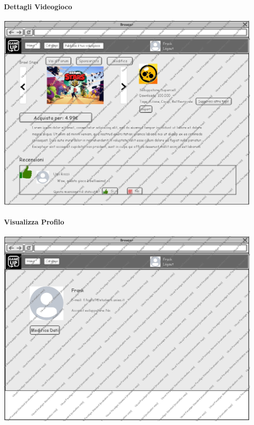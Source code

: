 \newpage
\paragraph{Dettagli Videogioco}
\begin{center}
\includegraphics[width=\textwidth,height=\textheight,keepaspectratio]{Figure/Mockups/DettagliVideogioco.jpg}
\end{center}

\newpage
\paragraph{Visualizza Profilo}
\begin{center}
\includegraphics[width=\textwidth,height=\textheight,keepaspectratio]{Figure/Mockups/VisualizzaProfilo.jpg}
\end{center}


